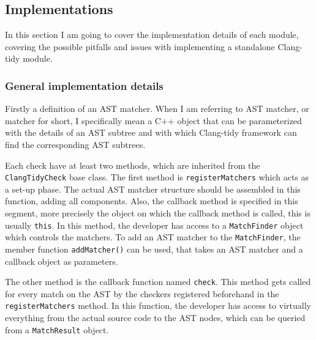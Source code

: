\subsection{Implementations}
\par In this section I am going to cover the implementation details of each module, covering the possible pitfalls and issues with implementing a standalone Clang-tidy module.
\subsubsection{General implementation details}
\par Firstly a definition of an AST matcher. When I am referring to AST matcher, or matcher for short, I specifically mean a C++ object that can be parameterized with the details of an AST subtree and with which Clang-tidy framework can find the corresponding AST subtrees. \medskip
\par Each check have at least two methods, which are inherited from the \verb|ClangTidyCheck| base class. The first method is \verb|registerMatchers| which acts as a set-up phase. The actual AST matcher structure should be assembled in this function, adding all components. Also, the callback method is specified in this segment, more precisely the object on which the callback method is called, this is usually \verb|this|. In this method, the developer has access to a \verb|MatchFinder| object which controls the matchers. To add an AST matcher to the \verb|MatchFinder|, the member function \verb|addMatcher()| can be used, that takes an AST matcher and a callback object as parameters. \medskip
\par The other method is the callback function named \verb|check|. This method gets called for every match on the AST by the checkers registered beforehand in the \verb|registerMatchers| method. In this function, the developer has access to virtually everything from the actual source code to the AST nodes, which can be queried from a \verb|MatchResult| object.
